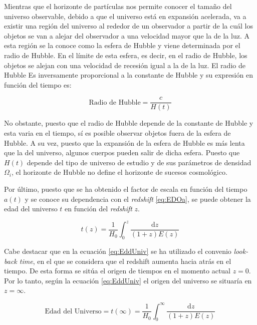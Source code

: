 \documentclass[twoside]{article}
\begin{document}
			Mientras que el horizonte de partículas nos permite conocer el tamaño del universo observable, debido a que el universo está en expansión acelerada, va a existir una región del universo al rededor de un observador a partir de la cuál los objetos se van a alejar del observador a una velocidad mayor que la de la luz. A esta región se la conoce como la esfera de Hubble y viene determinada por el radio de Hubble. En el límite de esta esfera, es decir, en el radio de Hubble, los objetos se alejan con una velocidad de recesión igual a la de la luz. El radio de Hubble Es inversamente proporcional a la constante de Hubble y su expresión en función del tiempo es:

				\begin{equation}
					\textrm{Radio de Hubble} = \frac{c}{H(t)}
					\label{eq:RadioHbbl}
				\end{equation}

			No obstante, puesto que el radio de Hubble depende de la constante de Hubble y esta varia en el tiempo, sí es posible observar objetos fuera de la esfera de Hubble. A su vez, puesto que la expansión de la esfera de Hubble es más lenta que la del universo, algunos cuerpos pueden salir de dicha esfera. Puesto que $H(t)$ depende del tipo de universo de estudio y de sus parámetros de densidad $\Omega_i$, el horizonte de Hubble no define el horizonte de sucesos cosmológico.

			Por último, puesto que se ha obtenido el factor de escala en función del tiempo $a(t)$ y se conoce su dependencia con el \textit{redshift} \ref{eq:EDOa}, se puede obtener la edad del universo $t$ en función del \textit{redshift} $z$.

				\begin{equation}
					t(z) = \frac{1}{H_0} \int_0^z \frac{\mathrm{d}z}{(1+z)E(z)}
					\label{eq:EddUniv}
				\end{equation}

			Cabe destacar que en la ecuación \ref{eq:EddUniv} se ha utilizado el convenio \textit{look-back time}, en el que se considera que el redshift aumenta hacia atrás en el tiempo. De esta forma se sitúa el origen de tiempos en el momento actual $z=0$. Por lo tanto, según la ecuación \ref{eq:EddUniv} el origen del universo se situaría en $z = \infty$.

				\begin{equation}
					\textrm{Edad del Universo} = t(\infty) = \frac{1}{H_0} \int_0^\infty \frac{\mathrm{d}z}{(1+z)E(z)}
				\end{equation}
\end{document}

